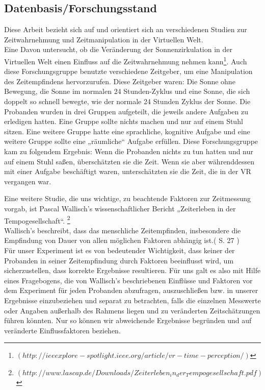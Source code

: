 \documentclass{Paper}
\begin{document}
\subsection{Datenbasis/Forschungsstand}
Diese Arbeit bezieht sich auf und orientiert sich an verschiedenen Studien zur Zeitwahrnehmung und Zeitmanipulation in der Virtuellen Welt. \\
Eine Davon untersucht, ob die Veränderung der Sonnenzirkulation in der Virtuellen Welt einen Einfluss auf die Zeitwahrnehmung nehmen kann\footnote{$(http://ieeexplore-spotlight.ieee.org/article/vr-time-perception/)$}.  Auch diese Forschungsgruppe benutzte verschiedene Zeitgeber, um eine Manipulation des Zeitempfindens hervorzurufen. Diese Zeitgeber waren: Die Sonne ohne Bewegung, die Sonne im normalen 24 Stunden-Zyklus und eine Sonne, die sich doppelt so schnell bewegte, wie der normale 24 Stunden Zyklus der Sonne. Die Probanden wurden in drei Gruppen aufgeteilt, die jeweils andere Aufgaben zu erledigen hatten. Eine Gruppe sollte nichts machen und nur auf einem Stuhl sitzen. Eine weitere Gruppe hatte eine sprachliche, kognitive Aufgabe und eine weitere Gruppe sollte eine „räumliche“ Aufgabe erfüllen. 
Diese Forschungsgruppe kam zu folgendem Ergebnis: Wenn die Probanden nichts zu tun hatten und nur auf einem Stuhl saßen, überschätzten sie die Zeit. Wenn sie aber währenddessen mit einer Aufgabe beschäftigt waren, unterschätzten sie die Zeit, die in der VR vergangen war. 
\par
Eine weitere Studie, die uns wichtige, zu beachtende Faktoren zur Zeitmessung vorgab, ist Pascal Wallisch's wissenschaftlicher Bericht „Zeiterleben in der Tempogesellschaft“. \footnote{$(http://www.lascap.de/Downloads/Zeiterleben_in_der_Tempogesellschaft.pdf)$} \\
Wallisch's beschreibt, \glqq dass das menschliche Zeitempfinden, insbesondere die Empfindung von Dauer von allen möglichen Faktoren abhängig ist\grqq .( S. 27 ) \\
 Für unser Experiment ist es von bedeutender Wichtigkeit, dass keiner der Probanden in seiner Zeitempfindung durch Faktoren beeinflusst wird, um sicherzustellen, dass korrekte Ergebnisse resultieren. 
Für uns galt es also mit Hilfe eines Fragebogens, die von Wallisch’s beschriebenen Einflüsse und Faktoren vor dem Experiment für jeden Probanden abzufragen, auszuschließen bzw. in unserer Ergebnisse einzubeziehen und separat zu betrachten, falls die einzelnen Messwerte oder Angaben außerhalb des Rahmens liegen und zu veränderten Zeitschätzungen führen könnten. Nur so können wir abweichende Ergebnisse begründen und auf veränderte Einflussfaktoren beziehen.\\
\end{document}
